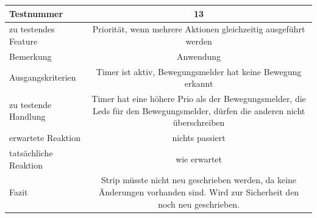 \documentclass[]{article}
\begin{document}
\begin{longtable}[]{@{}lc@{}}
\toprule
\begin{minipage}[b]{0.25\columnwidth}\raggedright\strut
Testnummer\strut
\end{minipage} & \begin{minipage}[b]{0.55\columnwidth}\centering\strut
13\strut
\end{minipage}\tabularnewline
\midrule
\endhead
\begin{minipage}[t]{0.25\columnwidth}\raggedright\strut
zu testendes Feature\strut
\end{minipage} & \begin{minipage}[t]{0.55\columnwidth}\centering\strut
Priorität, wenn mehrere Aktionen gleichzeitig ausgeführt werden\strut
\end{minipage}\tabularnewline
\begin{minipage}[t]{0.25\columnwidth}\raggedright\strut
Bemerkung\strut
\end{minipage} & \begin{minipage}[t]{0.55\columnwidth}\centering\strut
Anwendung\strut
\end{minipage}\tabularnewline
\begin{minipage}[t]{0.25\columnwidth}\raggedright\strut
Ausgangskriterien\strut
\end{minipage} & \begin{minipage}[t]{0.55\columnwidth}\centering\strut
Timer ist aktiv, Bewegungsmelder hat keine Bewegung erkannt\strut
\end{minipage}\tabularnewline
\begin{minipage}[t]{0.25\columnwidth}\raggedright\strut
zu testende Handlung\strut
\end{minipage} & \begin{minipage}[t]{0.55\columnwidth}\centering\strut
Timer hat eine höhere Prio als der Bewegungsmelder, die Leds für den
Bewegungsmelder, dürfen die anderen nicht überschreiben\strut
\end{minipage}\tabularnewline
\begin{minipage}[t]{0.25\columnwidth}\raggedright\strut
erwartete Reaktion\strut
\end{minipage} & \begin{minipage}[t]{0.55\columnwidth}\centering\strut
nichts passiert\strut
\end{minipage}\tabularnewline
\begin{minipage}[t]{0.25\columnwidth}\raggedright\strut
tatsächliche Reaktion\strut
\end{minipage} & \begin{minipage}[t]{0.55\columnwidth}\centering\strut
wie erwartet\strut
\end{minipage}\tabularnewline
\begin{minipage}[t]{0.25\columnwidth}\raggedright\strut
Fazit\strut
\end{minipage} & \begin{minipage}[t]{0.55\columnwidth}\centering\strut
Strip müsste nicht neu geschrieben werden, da keine Änderungen vorhanden
sind. Wird zur Sicherheit den noch neu geschrieben.\strut
\end{minipage}\tabularnewline
\bottomrule
\end{longtable}
\end{document}
